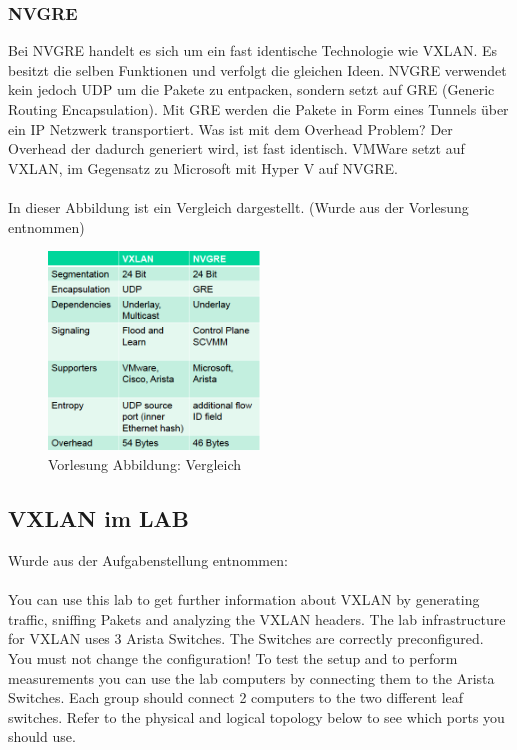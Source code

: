 \documentclass[a4,12pt]{scrartcl}
\begin{document}
\subsubsection{NVGRE}
Bei NVGRE handelt es sich um ein fast identische Technologie wie VXLAN. Es besitzt die selben Funktionen und verfolgt die gleichen Ideen. NVGRE verwendet kein jedoch UDP um die Pakete zu entpacken, sondern setzt auf GRE (Generic Routing Encapsulation). Mit GRE werden die Pakete in Form eines Tunnels über ein IP Netzwerk transportiert. Was ist mit dem Overhead Problem? Der Overhead der dadurch generiert wird, ist fast identisch. VMWare setzt auf VXLAN, im Gegensatz zu Microsoft mit Hyper V auf NVGRE. \\
\\
In dieser Abbildung ist ein Vergleich dargestellt. (Wurde aus der Vorlesung entnommen) 
\begin{figure} [H]
	\begin{center}
	\includegraphics[width=0.50\textwidth]{./pictures/vergleich_vxlan-nvgre.png}
	\caption{Vorlesung Abbildung: Vergleich}
	\label{x}
	\end{center}
\end{figure}

\subsection{VXLAN im LAB}
Wurde aus der Aufgabenstellung entnommen: \\
\\
You can use this lab to get further information about VXLAN by generating traffic, sniffing Pakets and analyzing the VXLAN headers. The lab infrastructure for VXLAN uses 3 Arista Switches. The Switches are correctly preconfigured. You must not change the configuration! To test the setup and to perform measurements you can use the lab computers by connecting them to the Arista Switches. Each group should connect 2 computers to the two different leaf switches. Refer to the physical and logical topology below to see which ports you should use.
\end{document}
